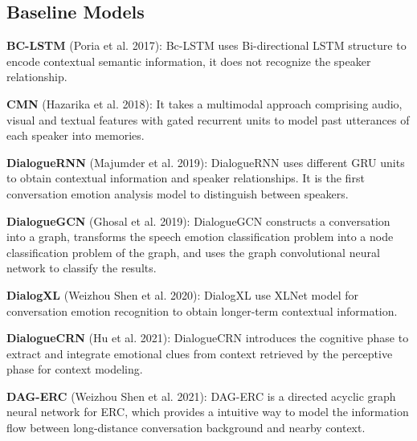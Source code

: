 \subsection{Baseline Models}
\noindent\textbf{BC-LSTM} (Poria et al. 2017): Bc-LSTM uses Bi-directional LSTM structure to encode contextual semantic information, it does not recognize the speaker relationship.

\noindent\textbf{CMN} (Hazarika et al. 2018): It takes a multimodal approach comprising audio, visual and textual features with gated recurrent units to model past utterances of each speaker into memories.

\noindent\textbf{DialogueRNN} (Majumder et al. 2019): DialogueRNN uses different GRU units to obtain contextual information and speaker relationships. It is the first conversation emotion analysis model to distinguish between speakers.

\noindent\textbf{DialogueGCN} (Ghosal et al. 2019): DialogueGCN constructs a conversation into a graph, transforms the speech emotion classification problem into a node classification problem of the graph, and uses the graph convolutional neural network to classify the results.

\noindent\textbf{DialogXL} (Weizhou Shen et al. 2020): DialogXL use XLNet model for conversation emotion recognition to obtain longer-term contextual information.

\noindent\textbf{DialogueCRN} (Hu et al. 2021): DialogueCRN introduces the cognitive phase to extract and integrate emotional clues from context retrieved by the perceptive phase for context modeling.

\noindent\textbf{DAG-ERC} (Weizhou Shen et al. 2021): DAG-ERC  is a directed acyclic graph neural network for ERC, which provides a intuitive way to model the information flow between long-distance conversation background and nearby context.


